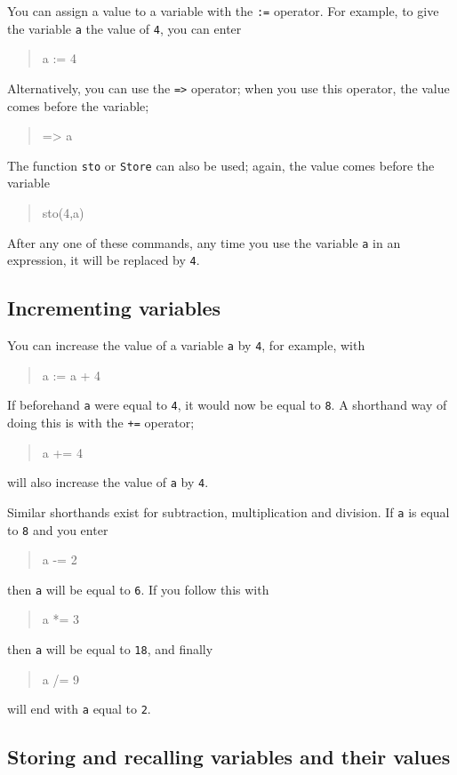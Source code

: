 \documentclass[a4paper,11pt]{book}
\newenvironment{giaccmd}
{\begin{quote}\ttfamily}
{\end{quote}}
\begin{document}
You can assign a value to a variable with the \texttt{:=}\index{:=}
operator. For example, to give the variable \texttt{a} the value of
\texttt{4}, you can enter
\begin{giaccmd}
  a := 4
\end{giaccmd}
Alternatively, you can use the \texttt{=>}\index{=>} operator; when
you use this operator, the value comes before the variable;
\begin{giaccmd}
  4 => a
\end{giaccmd}
The function \texttt{sto} or \texttt{Store}
can also be used; again, the value comes before the variable
\begin{giaccmd}
  sto(4,a)
\end{giaccmd}
After any one of these commands, any time you use the variable
\texttt{a} in an expression, it will be replaced by \texttt{4}.

\subsection{Incrementing variables}

You can increase the value of a variable \texttt{a} by \texttt{4}, for
example, with
\begin{giaccmd}
  a := a + 4
\end{giaccmd}
If beforehand \texttt{a} were equal to \texttt{4}, it would now be
equal to \texttt{8}.  A shorthand way of doing this is with the
\texttt{+=}\index{+=} operator;
\begin{giaccmd}
  a += 4
\end{giaccmd}
will also increase the value of \texttt{a} by \texttt{4}.

Similar shorthands exist for subtraction, multiplication and division.
If \texttt{a} is equal to \texttt{8} and you enter
\begin{giaccmd}
  a -= 2\index{-=}
\end{giaccmd}
then \texttt{a} will be equal to \texttt{6}.  If you follow this with
\begin{giaccmd}
  a *= 3\index{*=}
\end{giaccmd}
then \texttt{a} will be equal to \texttt{18}, and finally
\begin{giaccmd}
  a /= 9\index{/=}
\end{giaccmd}
will end with \texttt{a} equal to \texttt{2}.


\subsection{Storing and recalling variables and their values}
\end{document}

